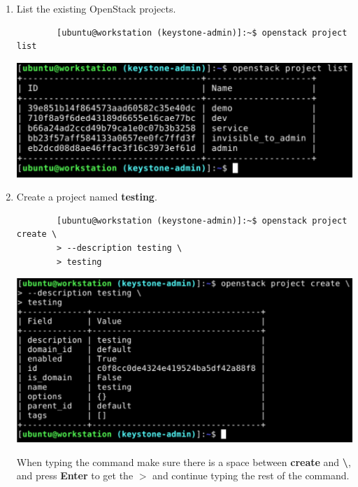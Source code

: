 \documentclass[letterpaper, 12pt]{article}
\begin{document}
\begin{enumerate}
    \item List the existing OpenStack projects.
    \begin{lstlisting}
        [ubuntu@workstation (keystone-admin)]:~$ openstack project list
    \end{lstlisting}

    \begin{center}
        \includegraphics[width=\linewidth]{images/part2/step3.png}
    \end{center}

    \item Create a project named \textbf{testing}.
    \begin{lstlisting}
        [ubuntu@workstation (keystone-admin)]:~$ openstack project create \
        > --description testing \
        > testing
    \end{lstlisting}

    \begin{center}
        \includegraphics[width=\linewidth]{images/part2/step4.png}
    \end{center}

    \begin{tipbox}
        When typing the command make sure there is a space between \textbf{create} and \textbf{\textbackslash}, and press \textbf{Enter} to get the \textbf{$>$} and continue typing the rest of the command.
    \end{tipbox}


\end{enumerate}
\end{document}
